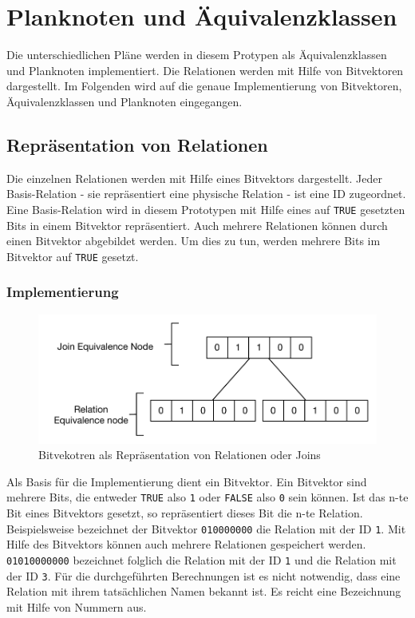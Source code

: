 \section{Planknoten und Äquivalenzklassen}

Die unterschiedlichen Pläne werden in diesem Protypen als Äquivalenzklassen und Planknoten implementiert. Die Relationen werden mit Hilfe von Bitvektoren dargestellt. Im Folgenden wird auf die genaue Implementierung von Bitvektoren, Äquivalenzklassen und Planknoten eingegangen.

\subsection{Repräsentation von Relationen}
\label{sec:Bitvector}

Die einzelnen Relationen werden mit Hilfe eines Bitvektors dargestellt. Jeder Basis-Relation - sie repräsentiert eine physische Relation - ist eine ID zugeordnet. Eine Basis-Relation wird in diesem Prototypen mit Hilfe eines auf \texttt{TRUE} gesetzten Bits in einem Bitvektor repräsentiert. Auch mehrere Relationen können durch einen Bitvektor abgebildet werden. Um dies zu tun, werden mehrere Bits  im Bitvektor auf \texttt{TRUE} gesetzt.

\subsubsection{Implementierung}
\begin{figure}[ht]
  \centering
  \includegraphics{04_Implementierung/00_media/Bitvector.pdf}
  \caption{Bitvekotren als Repräsentation von Relationen oder Joins}
  \label{Bitvektor}
\end{figure}

Als Basis für die Implementierung dient ein Bitvektor. Ein Bitvektor sind mehrere Bits, die entweder \texttt{TRUE} also \texttt{1} oder \texttt{FALSE} also \texttt{0} sein können. Ist das n-te Bit eines Bitvektors gesetzt, so repräsentiert dieses Bit die n-te Relation. Beispielsweise bezeichnet der Bitvektor \texttt{010000000} die Relation mit der ID \texttt{1}. Mit Hilfe des Bitvektors können auch mehrere Relationen gespeichert werden. \texttt{01010000000} bezeichnet folglich die Relation mit der ID \texttt{1} und die Relation mit der ID \texttt{3}. Für die durchgeführten Berechnungen ist es nicht notwendig, dass eine Relation mit ihrem tatsächlichen Namen bekannt ist. Es reicht eine Bezeichnung mit Hilfe von Nummern aus.

